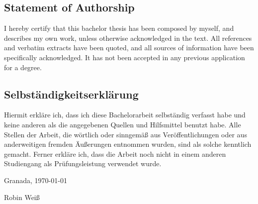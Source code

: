 \thispagestyle{empty}

\vspace{5cm}

\subsection*{Statement of Authorship}
I hereby certify that this bachelor thesis has been composed by myself, and describes my own work, unless otherwise acknowledged in the text. All references and verbatim extracts have been quoted, and all sources of information have been specifically acknowledged. It has not been accepted in any previous application for a degree.

\subsection*{Selbständigkeitserklärung}
Hiermit erkläre ich, dass ich diese Bachelorarbeit selbständig verfasst habe und keine anderen als die angegebenen Quellen und Hilfsmittel benutzt habe. Alle Stellen der Arbeit, die wörtlich oder sinngemäß aus Veröffentlichungen oder aus anderweitigen fremden Äußerungen entnommen wurden, sind als solche kenntlich gemacht. Ferner erkläre ich, dass die Arbeit noch nicht in einem anderen Studiengang als Prüfungsleistung verwendet wurde.

\vspace{1cm}

\noindent 
Granada, \today
  
\vspace{2cm}

\noindent
Robin Weiß



